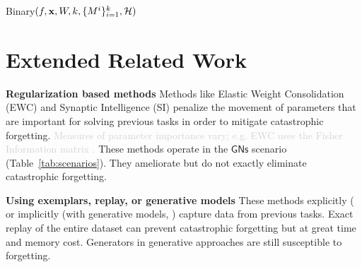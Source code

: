 \documentclass{article}
\DeclareMathOperator*{\argmax}{arg\,max}
\newcommand{\comments}[1]{#1}
\newcommand{\comments}[1]{}
\newcommand{\vivekr}[1]{\comments{\textcolor{purple}{[vivek: #1]}}}
\newcommand{\rosanne}[1]{\comments{\textcolor{magenta}{[rosanne: #1]}}}
\newcommand{\removed}[1]{\comments{\textcolor{lightgray}{#1}}}
\newcommand{\casename}[1]{\ensuremath{\mathsf{#1}}\xspace}
\newcommand{\tabref}[1]{Table~\ref{tab:#1}}
\begin{document}
\begin{algorithm}[tb]
\caption{Binary$(f, \mathbf{x}, W, k, \{M^i\}_{i=1}^k, \mathcal{H})$}\label{alg:binary}
\begin{algorithmic}[1] 
        \ENDIF
    \ENDFOR
\ENDWHILE
\STATE{$\textbf{return} \ \argmax_i  \alpha_i$}
\end{algorithmic}
\end{algorithm}

\section{Extended Related Work} \label{sec:ext-rw}


\textbf{Regularization based methods }
Methods like Elastic Weight Consolidation (EWC) \cite{kirkpatrick2017overcoming} and Synaptic Intelligence (SI) \cite{zenke2017continual} penalize the movement of parameters that are important for solving previous tasks 
in order to mitigate catastrophic forgetting.
\removed{Measures of parameter importance vary; e.g. EWC uses the Fisher Information matrix \cite{pascanu2013revisiting}.} These methods operate in the \casename{GNs} scenario (\tabref{scenarios}).
They ameliorate but do not exactly eliminate catastrophic forgetting.


\textbf{Using exemplars, replay, or generative models }
These methods explicitly (\cite{rebuffi2017icarl, lopez2017gradient, chaudhry2018efficient} or implicitly (with generative models, \cite{rolnick2019experience, shin2017continual}) capture data from previous tasks. 
Exact replay of the entire dataset can prevent catastrophic forgetting but at great time and memory cost. Generators in generative approaches are still susceptible to forgetting.
\end{document}
